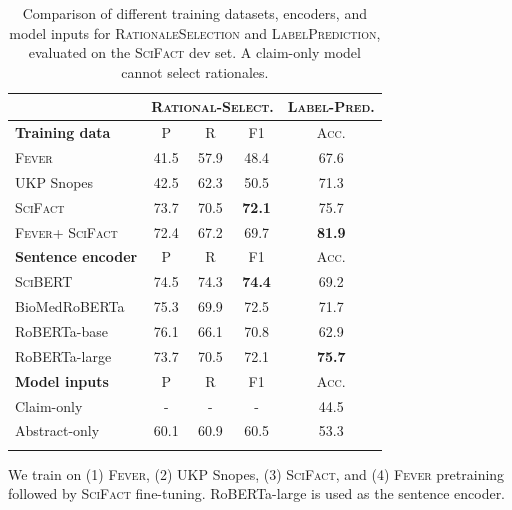 \documentclass[11pt,a4paper]{article}
\newcommand{\ours}{\textsc{SciFact}\xspace}
\newcommand{\fever}{\textsc{Fever}\xspace}
\newcommand{\snopes}{UKP Snopes\xspace}
\newcommand{\scibert}{\textsc{SciBERT}\xspace}
\newcommand{\bioroberta}{BioMedRoBERTa\xspace }
\newcommand{\robertabase}{RoBERTa-base\xspace}
\newcommand{\robertalarge}{RoBERTa-large\xspace}
\newcommand{\componenttwo}{\textsc{RationaleSelection}\xspace}
\newcommand{\componentthree}{\textsc{LabelPrediction}\xspace}
\begin{document}
\begin{table}[t]
  \footnotesize
  \setlength{\tabcolsep}{0.5em}
  \centering

  \begin{tabularx}{\columnwidth}{l *{3}{c}  *{3}{c}}
    \toprule
 & \multicolumn{3}{c}{\textsc{Rational-Select.}} & \multicolumn{3}{c}{\textsc{Label-Pred.}} \\


    \midrule
    \textbf{Training data} & P & R & F1 & \multicolumn{3}{c}{\textsc{Acc.}} \\

    \arrayrulecolor{black!30}\midrule


    \fever         &      41.5 &   57.9 &  48.4 &  \multicolumn{3}{c}{67.6} \\
    \snopes        &      42.5 &   62.3 &  50.5 &  \multicolumn{3}{c}{71.3} \\
    \ours          &      73.7 &   70.5 &  \textbf{72.1} &  \multicolumn{3}{c}{75.7} \\
    \fever + \ours &      72.4 &   67.2 &  69.7 &  \multicolumn{3}{c}{\textbf{81.9}} \\

    \arrayrulecolor{black}
    \midrule

    \textbf{Sentence encoder} & P & R & F1 & \multicolumn{3}{c}{\textsc{Acc.}} \\
    \arrayrulecolor{black!30}\midrule


    \scibert      &      74.5 &   74.3 &  \textbf{74.4} &  \multicolumn{3}{c}{69.2} \\
    \bioroberta   &      75.3 &   69.9 &  72.5 &  \multicolumn{3}{c}{71.7} \\
    \robertabase  &      76.1 &   66.1 &  70.8 &  \multicolumn{3}{c}{62.9} \\
    \robertalarge &      73.7 &   70.5 &  72.1 &  \multicolumn{3}{c}{\textbf{75.7}} \\

    \arrayrulecolor{black}
    \midrule

    \textbf{Model inputs} & P & R & F1 & \multicolumn{3}{c}{\textsc{Acc.}} \\
    \arrayrulecolor{black!30}\midrule
Claim-only         &      - &   - &  - &  \multicolumn{3}{c}{44.5} \\
    Abstract-only         &   60.1 &   60.9 &  60.5 &  \multicolumn{3}{c}{53.3} \\

    \arrayrulecolor{black}
    \bottomrule
  \end{tabularx}

  \caption{Comparison of different training datasets, encoders, and model inputs for \componenttwo and \componentthree, evaluated on the \ours dev set. A claim-only model cannot select rationales.}
  \label{tbl:components}

\end{table} \vspace{.2cm} 
We train on (1) \fever, (2) \snopes, (3) \ours, and (4) \fever pretraining followed by \ours fine-tuning. \robertalarge \cite{Liu2019RoBERTaAR} is used as the sentence encoder.
\end{document}
